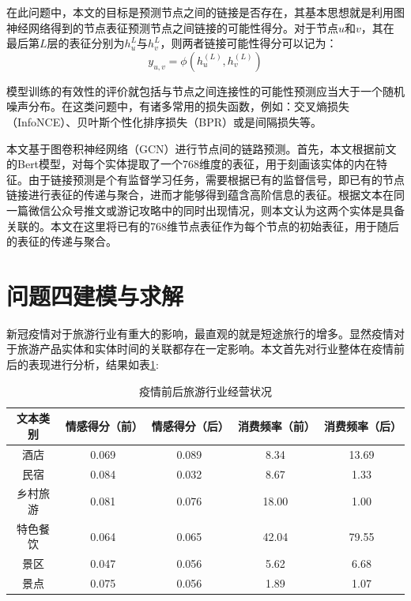 \documentclass[bwprint]{gmcmthesis}
\begin{document}
在此问题中，本文的目标是预测节点之间的链接是否存在，其基本思想就是利用图神经网络得到的节点表征预测节点之间链接的可能性得分。对于节点$u$和$v$，其在最后第$L$层的表征分别为$h_u^{L}$与$h_v^{L}$，则两者链接可能性得分可以记为：
\begin{equation}
	y_{u, v} = \phi(h_u^{(L)}, h_v^{(L)})
\end{equation}

模型训练的有效性的评价就包括与节点之间连接性的可能性预测应当大于一个随机噪声分布。在这类问题中，有诸多常用的损失函数，例如：交叉熵损失（InfoNCE）、贝叶斯个性化排序损失（BPR）或是间隔损失等。

本文基于图卷积神经网络（GCN）进行节点间的链路预测。首先，本文根据前文的Bert模型，对每个实体提取了一个768维度的表征，用于刻画该实体的内在特征。由于链接预测是个有监督学习任务，需要根据已有的监督信号，即已有的节点链接进行表征的传递与聚合，进而才能够得到蕴含高阶信息的表征。根据文本在同一篇微信公众号推文或游记攻略中的同时出现情况，则本文认为这两个实体是具备关联的。本文在这里将已有的768维节点表征作为每个节点的初始表征，用于随后的表征的传递与聚合。


\section{问题四建模与求解}

新冠疫情对于旅游行业有重大的影响，最直观的就是短途旅行的增多。显然疫情对于旅游产品实体和实体时间的关联都存在一定影响。本文首先对行业整体在疫情前后的表现进行分析，结果如表\ref{hangye_beforeafter}:

\begin{center}
    \begin{longtable}{c|c|c|c|c}
      \caption{疫情前后旅游行业经营状况}
      \label{hangye_beforeafter}\\
        \hline
        \textbf{文本类别} & \textbf{情感得分（前）} & \textbf{情感得分（后）} & \textbf{消费频率（前）} & \textbf{消费频率（后）} \\
        \hline
          酒店 & 0.069 & 0.089 &  8.34 & 13.69 \\
		  民宿 & 0.084 & 0.032 &  8.67 & 1.33 \\
		  乡村旅游 & 0.081 & 0.076 & 18.00 & 1.00 \\
		  特色餐饮 & 0.064 & 0.065 & 42.04 & 79.55 \\
		  景区 & 0.047 & 0.056 & 5.62 & 6.68 \\
		  景点 & 0.075 & 0.056 & 1.89 & 1.07 \\
        \hline
    \end{longtable}
    \end{center}
\end{document}
